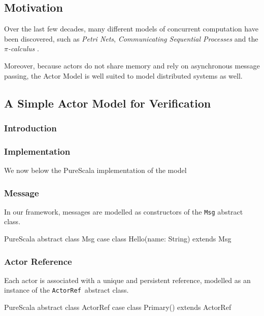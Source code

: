 \documentclass[a4paper,twoside]{article}
\newcommand{\InlineS}[1]{\lstinline[language=PureScala,basicstyle=\small\ttfamily,columns=fixed]|#1|}
\newcommand{\ActorRef}{\InlineS{ActorRef}\ }
\begin{document}
\subsection{Motivation}

Over the last few decades, many different models of concurrent computation have been discovered, such as \textit{Petri Nets}, \textit{Communicating Sequential Processes} and the \textit{$\pi$-calculus} \cite{algebraicactors}. 

Moreover, because actors do not share memory and rely on asynchronous message passing, the Actor Model is well suited to model distributed systems as well.

\subsection{A Simple Actor Model for Verification}

\subsubsection{Introduction}

\subsubsection{Implementation}
\label{actor-impl}

We now below the PureScala implementation of the model 

\subsubsection*{Message}

In our framework, messages are modelled as constructors of the \InlineS{Msg} abstract class.

\begin{ShortCode}{PureScala}
abstract class Msg
case class Hello(name: String) extends Msg
\end{ShortCode}

\vspace{-15pt}
\subsubsection*{Actor Reference}

Each actor is associated with a unique and persistent reference, modelled as an instance of the \ActorRef abstract class.

\begin{ShortCode}{PureScala}
abstract class ActorRef
case class Primary() extends ActorRef
\end{ShortCode}
\end{document}

